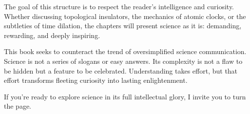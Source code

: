 The goal of this structure is to respect the reader’s intelligence and curiosity. Whether discussing topological insulators, the mechanics of atomic clocks, or the subtleties of time dilation, the chapters will present science as it is: demanding, rewarding, and deeply inspiring.

This book seeks to counteract the trend of oversimplified science communication. Science is not a series of slogans or easy answers. Its complexity is not a flaw to be hidden but a feature to be celebrated. Understanding takes effort, but that effort transforms fleeting curiosity into lasting enlightenment.

If you’re ready to explore science in its full intellectual glory, I invite you to turn the page.

